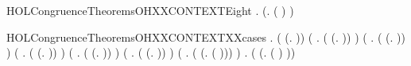 \newcommand{\HOLCongruenceTheoremsOHXXCONTEXTSeven}{\UseVerbatim{HOLCongruenceTheoremsOHXXCONTEXTSeven}}
\begin{SaveVerbatim}{HOLCongruenceTheoremsOHXXCONTEXTEight}
\HOLTokenTurnstile{} \HOLSymConst{\HOLTokenForall{}} .   \HOLSymConst{\HOLTokenImp{}}  (\HOLTokenLambda{}.  ( ) )
\end{SaveVerbatim}
\newcommand{\HOLCongruenceTheoremsOHXXCONTEXTEight}{\UseVerbatim{HOLCongruenceTheoremsOHXXCONTEXTEight}}
\begin{SaveVerbatim}{HOLCongruenceTheoremsOHXXCONTEXTXXcases}
\HOLTokenTurnstile{} \HOLSymConst{\HOLTokenForall{}}.
         \HOLSymConst{\HOLTokenEquiv{}}
       ( \HOLSymConst{=} (\HOLTokenLambda{}. )) \HOLSymConst{\HOLTokenDisj{}}
       (\HOLSymConst{\HOLTokenExists{}} . ( \HOLSymConst{=} (\HOLTokenLambda{}.  )) \HOLSymConst{\HOLTokenConj{}}  ) \HOLSymConst{\HOLTokenDisj{}}
       (\HOLSymConst{\HOLTokenExists{}} . ( \HOLSymConst{=} (\HOLTokenLambda{}.   \HOLSymConst{+} )) \HOLSymConst{\HOLTokenConj{}}  ) \HOLSymConst{\HOLTokenDisj{}}
       (\HOLSymConst{\HOLTokenExists{}} . ( \HOLSymConst{=} (\HOLTokenLambda{}.  \HOLSymConst{+}  )) \HOLSymConst{\HOLTokenConj{}}  ) \HOLSymConst{\HOLTokenDisj{}}
       (\HOLSymConst{\HOLTokenExists{}} . ( \HOLSymConst{=} (\HOLTokenLambda{}.   \HOLSymConst{\ensuremath{\parallel}} )) \HOLSymConst{\HOLTokenConj{}}  ) \HOLSymConst{\HOLTokenDisj{}}
       (\HOLSymConst{\HOLTokenExists{}} . ( \HOLSymConst{=} (\HOLTokenLambda{}.  \HOLSymConst{\ensuremath{\parallel}}  )) \HOLSymConst{\HOLTokenConj{}}  ) \HOLSymConst{\HOLTokenDisj{}}
       (\HOLSymConst{\HOLTokenExists{}} . ( \HOLSymConst{=} (\HOLTokenLambda{}. \HOLConst{\ensuremath{\nu}}  ( ))) \HOLSymConst{\HOLTokenConj{}}  ) \HOLSymConst{\HOLTokenDisj{}}
       \HOLSymConst{\HOLTokenExists{}} . ( \HOLSymConst{=} (\HOLTokenLambda{}.  ( ) )) \HOLSymConst{\HOLTokenConj{}}  
\end{SaveVerbatim}
